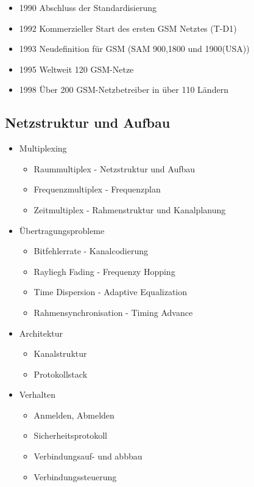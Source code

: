 \begin{itemize}
\begin{itemize}
\begin{itemize}
\end{itemize}
\item 1990 Abschluss der Standardisierung 
\item 1992 Kommerzieller Start des ersten GSM Netztes (T-D1)
\item 1993 Neudefinition für GSM (SAM 900,1800 und 1900(USA))
\item 1995 Weltweit 120 GSM-Netze 
\item 1998 Über 200 GSM-Netzbetreiber in über 110 Ländern
\end{itemize}
\end{itemize}

\subsection{Netzstruktur und Aufbau}
\begin{itemize}
\item Multiplexing
\begin{itemize}
\item Raummultiplex - Netzstruktur und Aufbau
\item Frequenzmultiplex - Frequenzplan
\item Zeitmultiplex - Rahmenstruktur und Kanalplanung
\end{itemize}
\item Übertragungsprobleme
\begin{itemize}
\item Bitfehlerrate - Kanalcodierung
\item Rayliegh Fading - Frequenzy Hopping
\item Time Dispersion - Adaptive Equalization
\item Rahmensynchronisation - Timing Advance
\end{itemize}
\item Architektur
\begin{itemize}
\item Kanalstruktur
\item Protokollstack
\end{itemize}
\item Verhalten
\begin{itemize}
\item Anmelden, Abmelden
\item Sicherheitsprotokoll
\item Verbindungsauf- und abbbau
\item Verbindungssteuerung
\end{itemize}
\end{itemize}

